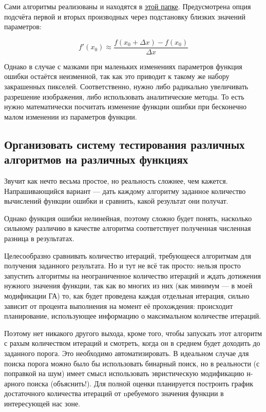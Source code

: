 Сами алгоритмы реализованы и находятся в \href{https://github.com/donRumata03/PowerfulGA/blob/master/other_optimization/local_optimization.cpp}{этой папке}.
Предусмотрена опция подсчёта первой и вторых производных через подстановку близких значений параметров:

\begin{equation}
    f'(x_0) \approx \frac{f(x_0 + \Delta x) - f(x_0)}{\Delta x}
\end{equation}

Однако в случае с мазками при маленьких изменениях параметров функция ошибки остаётся неизменной, так как это приводит к такому же набору закрашенных пикселей.
Соответственно, нужно либо радикально увеличивать разрешение изображения, либо использовать аналитические методы.
То есть нужно математически посчитать изменение функции ошибки при бесконечно малом изменении из параметров функции.

 \subsection{Организовать систему тестирования различных алгоритмов на различных функциях}\label{itm:testing_system}
Звучит как нечто весьма простое, но реальность сложнее, чем кажется.
Напрашивающийся вариант — дать каждому алгоритму заданное количество вычислений функции ошибки и сравнить, какой результат они получат.

Однако функция ошибки нелинейная, поэтому сложно будет понять,
насколько сильному различию в качестве алгоритма соответствует полученная численная разница в результатах.

Целесообразно сравнивать количество итераций, требующееся алгоритмам для получения заданного результата.
Но и тут не всё так просто: нельзя просто запустить алгоритмы на неограниченное количество итераций
и ждать дотижения нужного значения функции,
так как во многих из них (как минимум — в моей модификации ГА) то,
как будет проведена каждая отдельная итерация, сильно зависит от процента выполнения на момент её прохождения:
происходит планирование,  использующее информацию о максимальном количестве итераций.


Поэтому нет никакого другого выхода, кроме того, чтобы запускать этот алгоритм с рахым количеством итераций и смотреть, когда он в среднем будет доходить до заданного порога.
Это необходимо автоматизировать.
В идеальном случае для поиска порога можно было бы использовать бинарный поиск, но в реальности (с поправкой на шум) имеет смысл использовать эвристическую модификацию н-арного поиска (объяснить!).
Для полной оценки планируется построить график достаточного количества итераций от nребуемого значения функции в интересующей нас зоне.

